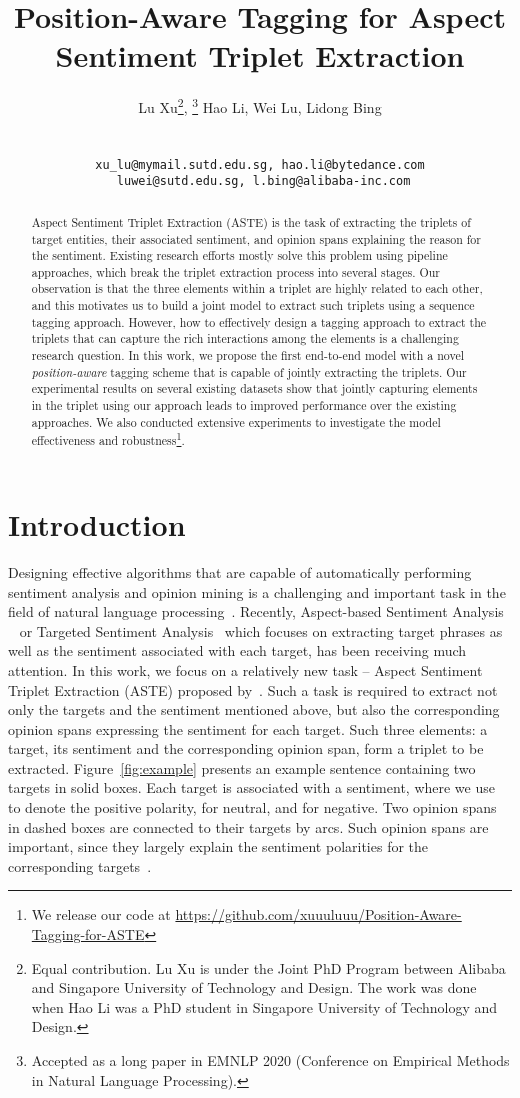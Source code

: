 \documentclass[11pt,a4paper]{article}
\title{Position-Aware Tagging for Aspect Sentiment Triplet Extraction}
\author{Lu Xu\affmark[* 1, 2]\thanks{ Equal contribution.  Lu Xu is under the Joint PhD Program between Alibaba and Singapore University of Technology and Design. The work was done when Hao Li was a PhD student in Singapore University of Technology and Design.},
\thanks {Accepted as a long paper in EMNLP 2020 (Conference on Empirical Methods in Natural Language Processing).} 
Hao Li\affmark[* 1, 3], Wei Lu\affmark[1], Lidong Bing\affmark[2]\\
\affaddr{\affmark[1] StatNLP Research Group, Singapore University of Technology and Design}\\
\affaddr{\affmark[2] DAMO Academy, Alibaba Group}~~ \affaddr{\affmark[3]ByteDance}\\
\tt{xu\_lu@mymail.sutd.edu.sg, hao.li@bytedance.com}\\
\tt{ luwei@sutd.edu.sg, l.bing@alibaba-inc.com}\\
}
\date{}
\begin{document}
\maketitle
\begin{abstract}
Aspect Sentiment Triplet Extraction (ASTE) is the task of extracting the triplets of target entities, their associated sentiment, and opinion spans explaining the reason for the sentiment.
Existing research efforts mostly solve this problem using pipeline approaches, which break the triplet extraction process into several stages. 
Our observation is that the three elements within a triplet are highly related to each other, and this motivates us to build a joint model to extract such triplets using a sequence tagging approach.
However, how to effectively design a tagging approach to extract the triplets that can capture the rich interactions among the elements is a challenging research question.
In this work, we propose the first end-to-end model with a novel {\em position-aware} tagging scheme that is capable of jointly extracting the triplets.
Our experimental results on several existing datasets show that jointly capturing elements in the triplet using our approach leads to improved performance over the existing approaches.
We also conducted extensive experiments to investigate the model effectiveness and robustness\footnote{We release our code at \url{https://github.com/xuuuluuu/Position-Aware-Tagging-for-ASTE}}.


\end{abstract}




\section{Introduction}
\label{sec:intro}

Designing effective algorithms that are capable of automatically performing sentiment analysis and opinion mining is a challenging and important task in the field of natural language processing~\cite{pang2008opinion,liu2010sentiment,ortigosa2014sentiment,smailovic2013predictive,li2010using}.
Recently, Aspect-based Sentiment Analysis ~\cite{pontiki-EtAl:2014:SemEval} or Targeted Sentiment Analysis~\cite{mitchell2013open} which focuses on extracting target phrases as well as the sentiment associated with each target, has been receiving much attention.
In this work, we focus on a relatively new task -- Aspect Sentiment Triplet Extraction (ASTE) proposed by~\citet{peng2019knowing}. 
Such a task is required to extract not only the targets and the sentiment mentioned above, but also the corresponding opinion spans expressing the sentiment for each target.
Such three elements: a target, its sentiment and the corresponding opinion span, form a triplet to be extracted.
Figure~\ref{fig:example} presents an example sentence containing two targets in solid boxes.
Each target is associated with a sentiment, where we use  to denote the positive polarity,  for neutral, and  for negative.
Two opinion spans in dashed boxes are connected to their targets by arcs.
Such opinion spans are important, since they largely explain the sentiment polarities for the corresponding targets~\cite{qiu-etal-2011-opinion,yang-cardie-2012-extracting}.
\end{document}

